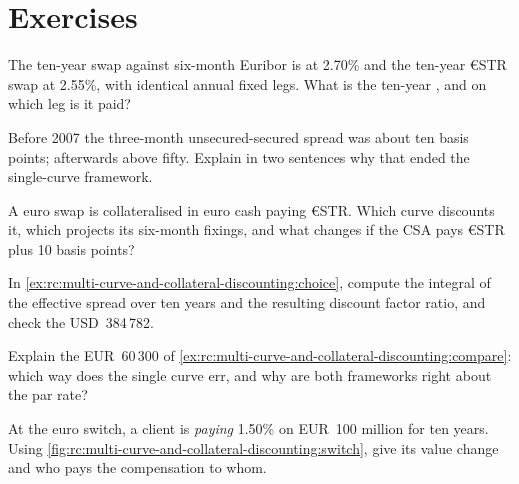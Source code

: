 \section{Exercises}

\begin{exercise}[$\star$]\label{exo:rc:multi-curve-and-collateral-discounting:1}
The ten-year swap against six-month Euribor is at 2.70\% and the ten-year
€STR swap at 2.55\%, with identical annual fixed legs. What is the ten-year
, and on which leg is it paid?
\end{exercise}

\begin{exercise}[$\star$]\label{exo:rc:multi-curve-and-collateral-discounting:2}
Before 2007 the three-month unsecured-secured spread was about ten basis
points; afterwards above fifty. Explain in two sentences why that ended the
single-curve framework.
\end{exercise}

\begin{exercise}[$\star$]\label{exo:rc:multi-curve-and-collateral-discounting:3}
A euro swap is collateralised in euro cash paying €STR. Which curve discounts
it, which projects its six-month fixings, and what changes if the CSA pays
€STR plus 10 basis points?
\end{exercise}

\begin{exercise}[$\star\star$]\label{exo:rc:multi-curve-and-collateral-discounting:4}
In \cref{ex:rc:multi-curve-and-collateral-discounting:choice}, compute the
integral of the effective spread over ten years and the resulting discount
factor ratio, and check the USD~384\,782.
\end{exercise}

\begin{exercise}[$\star\star$]\label{exo:rc:multi-curve-and-collateral-discounting:5}
Explain the EUR~60\,300 of
\cref{ex:rc:multi-curve-and-collateral-discounting:compare}: which way does the
single curve err, and why are both frameworks right about the par rate?
\end{exercise}

\begin{exercise}[$\star\star$]\label{exo:rc:multi-curve-and-collateral-discounting:6}
At the euro switch, a client is \emph{paying} 1.50\% on EUR~100 million for
ten years. Using \cref{fig:rc:multi-curve-and-collateral-discounting:switch},
give its value change and who pays the compensation to whom.
\end{exercise}

